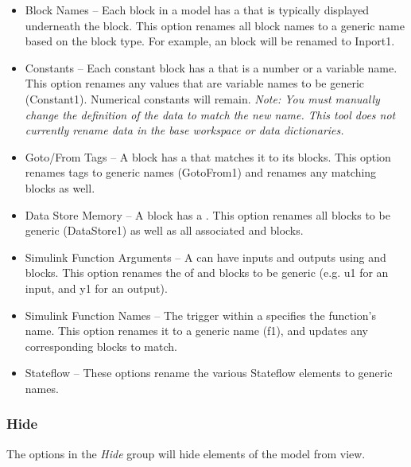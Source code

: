 \documentclass{article}
\begin{document}
\begin{itemize}
	\item Block Names -- Each block in a model has a  that is typically displayed underneath the block. This option renames all block names to a generic name based on the block type. For example, an \inport block will be renamed to Inport1.
	
	\item Constants -- Each constant block has a  that is a number or a variable name. This option renames any values that are variable names to be generic (\eg Constant1). Numerical constants will remain. \emph{Note: You must manually change the definition of the data to match the new name. This tool does not currently rename data in the base workspace or data dictionaries.}
	
	\item Goto/From Tags -- A \goto block has a  that matches it to its \from blocks. This option renames tags to generic names (\eg GotoFrom1) and renames any matching \from blocks as well.
	
	\item Data Store Memory -- A \DSM block has a . This option renames all  \DSM blocks to be generic (\eg DataStore1) as well as all associated \DSR and \DSW blocks.
	
	\item Simulink Function Arguments -- A \simfunc can have inputs and outputs using \argin and \argout blocks. This option renames the  of \argin and \argout blocks to be generic (e.g. u1 for an input, and y1 for an output).

	\item Simulink Function Names -- The trigger within a \simfunc specifies the function's name. This option renames it to a generic name (\eg f1), and updates any corresponding \simfunccaller blocks to match.
	
	\item Stateflow -- These options rename the various Stateflow elements to generic names.
\end{itemize}

\subsubsection{Hide}
The options in the \emph{Hide} group will hide elements of the model from view.
\end{document}

